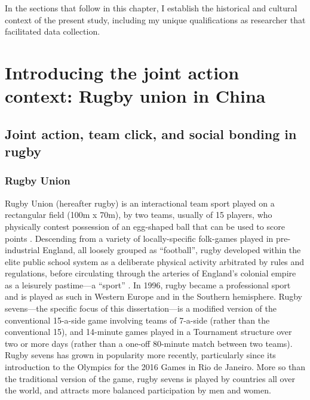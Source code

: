 %





In the sections that follow in this chapter, I establish the historical and cultural context of the present study, including my unique qualifications as researcher that facilitated data collection.

\section{Introducing the joint action context: Rugby union in China}


\subsection{Joint action, team click, and social bonding in rugby}

  \subsubsection{Rugby Union}
  Rugby Union (hereafter rugby) is an interactional team sport played on a rectangular field (100m x 70m), by two teams, usually of 15 players, who physically contest possession of an egg-shaped ball that can be used to score points \citep{IRB2014}.  Descending from a variety of locally-specific folk-games played in pre-industrial England, all loosely grouped as ``football'', rugby developed within the elite public school system as a deliberate physical activity arbitrated by rules and regulations, before circulating through the arteries of England's colonial empire as a leisurely pastime—a ``sport'' \citep{Dunning2005}.  In 1996, rugby became a professional sport and is played as such in Western Europe and in the Southern hemisphere. Rugby sevens---the specific focus of this dissertation---is a modified version of the conventional 15-a-side game involving teams of 7-a-side (rather than the conventional 15), and 14-minute games played in a Tournament structure over two or more days (rather than a one-off 80-minute match between two teams).  Rugby sevens has grown in popularity more recently, particularly since its introduction to the Olympics for the 2016 Games in Rio de Janeiro.  More so than the traditional version of the game, rugby sevens is played by countries all over the world, and attracts more balanced participation by men and women.

